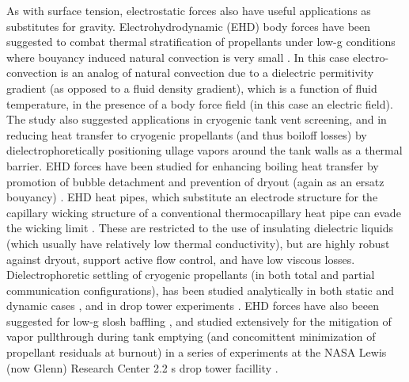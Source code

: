 \documentclass[12pt,a4paper,oneside]{book}
\begin{document}
As with surface tension, electrostatic forces also have useful applications as substitutes for gravity. Electrohydrodynamic (EHD) body forces have been suggested to combat thermal stratification of propellants under low-g conditions where bouyancy induced natural convection is very small \cite{blackmon_collection_1965}. In this case electro-convection is an analog of natural convection due to a dielectric permitivity gradient (as opposed to a fluid density gradient), which is a function of fluid temperature, in the presence of a body force field (in this case an electric field). The study also suggested applications in cryogenic tank vent screening, and in reducing heat transfer to cryogenic propellants (and thus boiloff losses) by dielectrophoretically positioning ullage vapors around the tank walls as a thermal barrier. EHD forces have been studied for enhancing boiling heat transfer by promotion of bubble detachment and prevention of dryout (again as an ersatz bouyancy) \cite{snyder_dielectrophoresis_2001} \cite{di_marco_influence_2003} \cite{marco_use_2012}. EHD heat pipes, which substitute an electrode structure for the capillary wicking structure of a conventional thermocapillary heat pipe can evade the wicking limit \cite{jones_electrohydrodynamic_1973}. These are restricted to the use of insulating dielectric liquids (which usually have relatively low thermal conductivity), but are highly robust against dryout, support active flow control, and have low viscous losses. Dielectrophoretic settling of cryogenic propellants (in both total and partial communication configurations), has been studied analytically in both static \cite{hurwitz_electrohydrodynamic_1966} and dynamic cases \cite{koval_dynamics_1967}, and in drop tower experiments \cite{fax_dielectrophoretic_1969}. EHD forces have also beeen suggested for low-g slosh baffling \cite{boretz_orbital_1970} \cite{petrash_use_1968} \cite{hurwitz_dielectrophoretic_1968}, and studied extensively for the mitigation of vapor pullthrough during tank emptying (and concomittent minimization of propellant residuals at burnout) in a series of experiments at the NASA Lewis (now Glenn) Research Center 2.2 s drop tower facillity \cite{berenyi_dielectrophoretic_1970}. 
\end{document}
